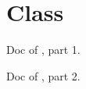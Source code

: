 \section{Class }\label{container-page-test-module-Toplevel+u+comments-class-c1}%
Doc of , part 1.

Doc of , part 2.



